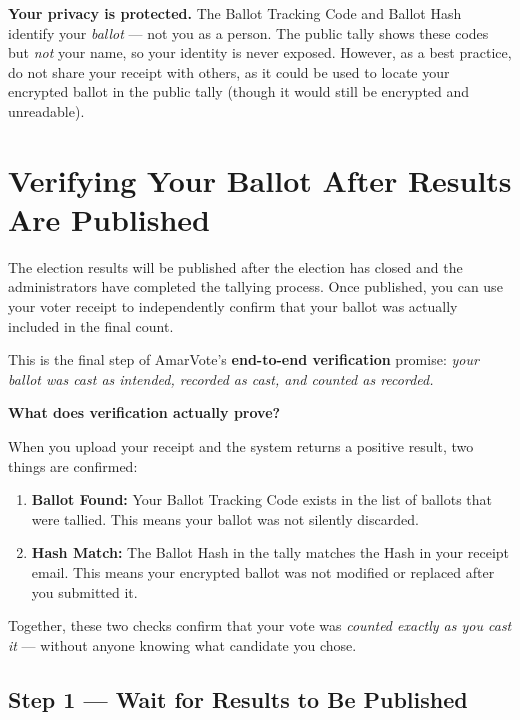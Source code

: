 \documentclass[12pt,a4paper,openany]{book}
\begin{document}
\begin{tcolorbox}[notebox]
	\textbf{Your privacy is protected.} The Ballot Tracking Code and Ballot Hash identify your \emph{ballot} --- not you as a person. The public tally shows these codes but \emph{not} your name, so your identity is never exposed. However, as a best practice, do not share your receipt with others, as it could be used to locate your encrypted ballot in the public tally (though it would still be encrypted and unreadable).
\end{tcolorbox}

\chapter{Verifying Your Ballot After Results Are Published}
\label{ch:verification}

The election results will be published after the election has closed and the administrators have completed the tallying process. Once published, you can use your voter receipt to independently confirm that your ballot was actually included in the final count.

This is the final step of AmarVote's \textbf{end-to-end verification} promise: \emph{your ballot was cast as intended, recorded as cast, and counted as recorded.}

\begin{tcolorbox}[conceptbox]
	\textbf{What does verification actually prove?}

	When you upload your receipt and the system returns a positive result, two things are confirmed:
	\begin{enumerate}
		\item \textbf{Ballot Found:} Your Ballot Tracking Code exists in the list of ballots that were tallied. This means your ballot was not silently discarded.
		\item \textbf{Hash Match:} The Ballot Hash in the tally matches the Hash in your receipt email. This means your encrypted ballot was not modified or replaced after you submitted it.
	\end{enumerate}
	Together, these two checks confirm that your vote was \emph{counted exactly as you cast it} --- without anyone knowing what candidate you chose.
\end{tcolorbox}

\section{Step 1 --- Wait for Results to Be Published}
\end{document}
